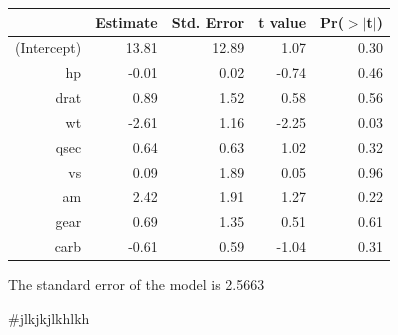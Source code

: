 \documentclass{article}\usepackage[]{graphicx}\usepackage[]{color}
\begin{document}
\begin{table}[ht]
\centering
\begin{tabular}{rrrrr}
  \hline
 & Estimate & Std. Error & t value & Pr($>$$|$t$|$) \\ 
  \hline
(Intercept) & 13.81 & 12.89 & 1.07 & 0.30 \\ 
  hp & -0.01 & 0.02 & -0.74 & 0.46 \\ 
  drat & 0.89 & 1.52 & 0.58 & 0.56 \\ 
  wt & -2.61 & 1.16 & -2.25 & 0.03 \\ 
  qsec & 0.64 & 0.63 & 1.02 & 0.32 \\ 
  vs & 0.09 & 1.89 & 0.05 & 0.96 \\ 
  am & 2.42 & 1.91 & 1.27 & 0.22 \\ 
  gear & 0.69 & 1.35 & 0.51 & 0.61 \\ 
  carb & -0.61 & 0.59 & -1.04 & 0.31 \\ 
   \hline
\end{tabular}
\end{table}




The standard error of the model is 2.5663

\newpage


#jlkjkjlkhlkh
\end{document}
